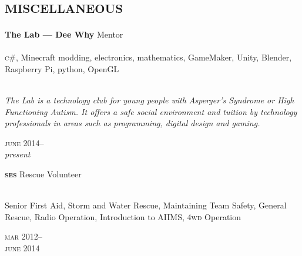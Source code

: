 

\section*{\textsc{miscellaneous}}
\vspace{-0.2cm}

\begin{minipage}[t]{0.75\textwidth}
\textbf{The Lab --- Dee Why}\phantom{..} Mentor \\
\\
\textsc{c\#}, Minecraft modding, electronics, mathematics, GameMaker, 
Unity, Blender, Raspberry Pi, python, OpenGL
\\
\\
{\small
\textit{The Lab is a technology club for young people with Asperger’s Syndrome or High Functioning Autism. It offers a safe social environment and tuition by technology professionals in areas such as programming, digital design and gaming.}
\par}
\end{minipage}
\begin{minipage}[t]{0.25\textwidth}
{
\hfill \textsc{june} 2014--\\ 
\hspace*{0pt} \hfill \textit{present}
\par
}
\end{minipage}

\vspace{0.2in}

\begin{minipage}[t]{0.75\textwidth}
\textbf{\textsc{ses}}\phantom{..} Rescue Volunteer\\
\\
{\small
Senior First Aid, Storm and Water Rescue, Maintaining Team Safety, 
General Rescue, Radio Operation, Introduction to AIIMS, 
\textsc{4wd} Operation
\par}
\end{minipage}
\begin{minipage}[t]{0.25\textwidth}
{
\hfill \textsc{mar} 2012--\\ 
\hspace*{0pt} \hfill \textsc{june} 2014
\par
}
\end{minipage}

\vspace{0.2in}

